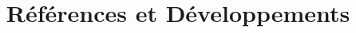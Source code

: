 \documentclass{agregfiche}
\title{Références et Développements}
\begin{document}
\maketitle

\secreferences

\begin{itemize}

\end{itemize}

\secdev

\begin{itemize}

\end{itemize}
\end{document}
